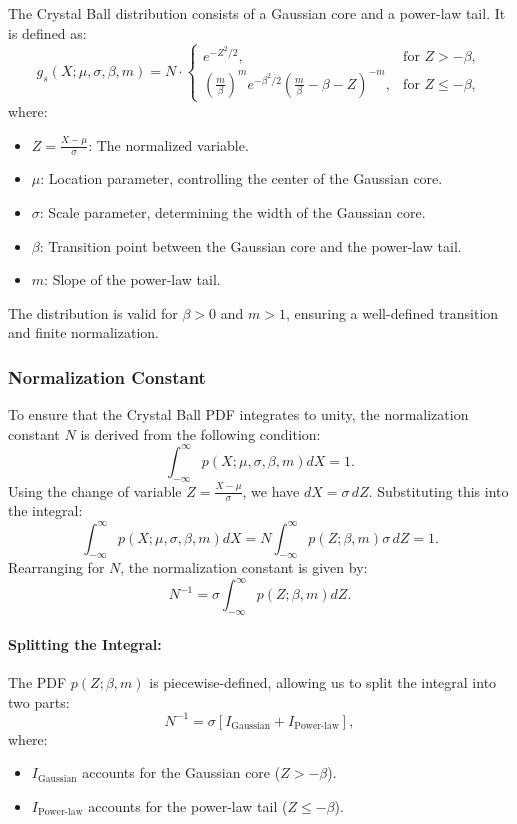 \documentclass[11pt, a4paper]{article}
\begin{document}
The Crystal Ball distribution consists of a Gaussian core and a power-law tail. It is defined as:
\begin{equation}
    g_s(X; \mu, \sigma, \beta, m) = N \cdot \begin{cases} 
        e^{-Z^2 / 2}, & \text{for } Z > -\beta, \\
        \left( \frac{m}{\beta} \right)^m e^{-\beta^2 / 2} \left( \frac{m}{\beta} - \beta - Z \right)^{-m}, & \text{for } Z \leq -\beta,
    \end{cases}
\end{equation}
where:
\begin{itemize}
    \item \( Z = \frac{X - \mu}{\sigma} \): The normalized variable.
    \item \( \mu \): Location parameter, controlling the center of the Gaussian core.
    \item \( \sigma \): Scale parameter, determining the width of the Gaussian core.
    \item \( \beta \): Transition point between the Gaussian core and the power-law tail.
    \item \( m \): Slope of the power-law tail.
\end{itemize}
The distribution is valid for \( \beta > 0 \) and \( m > 1 \), ensuring a well-defined transition and finite normalization.
\subsubsection{Normalization Constant}

To ensure that the Crystal Ball PDF integrates to unity, the normalization constant \( N \) is derived from the following condition:
\[
\int_{-\infty}^\infty p(X; \mu, \sigma, \beta, m) dX = 1.
\]
Using the change of variable \( Z = \frac{X - \mu}{\sigma} \), we have \( dX = \sigma \, dZ \). Substituting this into the integral:
\[
\int_{-\infty}^\infty p(X; \mu, \sigma, \beta, m) dX = N \int_{-\infty}^\infty p(Z; \beta, m) \sigma \, dZ = 1.
\]
Rearranging for \( N \), the normalization constant is given by:
\begin{equation}
    N^{-1} = \sigma \int_{-\infty}^\infty p(Z; \beta, m) dZ.
    \label{eq:normalization_condition}
\end{equation}

\paragraph{Splitting the Integral:} The PDF \( p(Z; \beta, m) \) is piecewise-defined, allowing us to split the integral into two parts:
\begin{equation}
    N^{-1} = \sigma \left[ I_{\text{Gaussian}} + I_{\text{Power-law}} \right],
    \label{eq:split_integral}
\end{equation}
where:
\begin{itemize}
    \item \( I_{\text{Gaussian}} \) accounts for the Gaussian core (\( Z > -\beta \)).
    \item \( I_{\text{Power-law}} \) accounts for the power-law tail (\( Z \leq -\beta \)).
\end{itemize}
\end{document}
